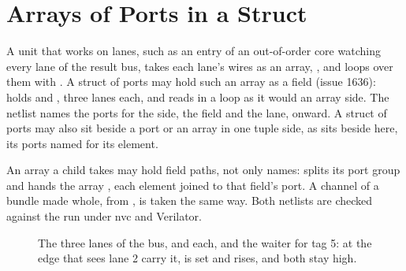 \section{Arrays of Ports in a Struct}
\label{sec:x-port-arrays}

A unit that works on lanes, such as an entry of an out-of-order core
watching every lane of the result bus, takes each lane's wires as an
array, \code{[In<Bit>; N]}, and loops over them with
. A struct of ports may hold such an array as a
field (issue 1636):  holds  and , three
lanes each, and  reads  in a loop as it
would an array side. The netlist names the ports for the side, the
field and the lane,  onward. A struct of ports may
also sit beside a port or an array in one tuple side, as 
sits beside  here, its ports named for its element.

An array a child takes may hold field paths, not only names:
 splits its port group  and hands  the
array \code{[p.a, p.b]}, each element joined to that field's port. A
channel of a bundle made whole,  from
, is taken the same way. Both netlists are checked
against the run under nvc and Verilator.

\begin{figure}[htbp]
\centering

\caption{The three lanes of the bus,  and  each,
and the waiter for tag 5: at the edge that sees lane 2 carry it,
 is set and  rises, and both stay high.}
\label{fig:x-port-arrays}
\end{figure}




